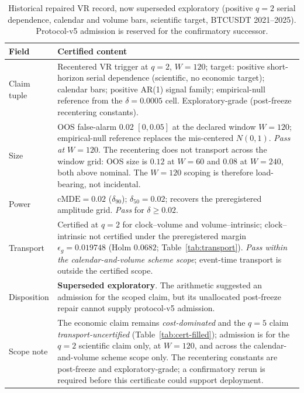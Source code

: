 \documentclass[3p]{elsarticle}
\newcommand{\epsg}{\ensuremath{\epsilon_g}}
\newcommand{\dataspan}{2021--2025}
\begin{document}
\begin{table}[htbp]
\centering
\begin{threeparttable}
\caption{Historical repaired VR record, now superseded exploratory
(positive $q{=}2$ serial dependence, calendar and volume bars, scientific
target, BTCUSDT \dataspan). Protocol-v5 admission is reserved for the
confirmatory successor.}
\label{tab:cert-admissible}
\small
\begin{tabularx}{\textwidth}{@{}lX@{}}
\toprule
Field & Certified content \\
\midrule
Claim tuple & Recentered VR trigger at $q{=}2$, $W{=}120$; target: positive short-horizon serial dependence (scientific, no economic target); calendar bars; positive AR(1) signal family; empirical-null reference from the $\delta\!=\!0.0005$ cell. Exploratory-grade (post-freeze recentering constants). \\
Size & OOS false-alarm $0.02$ $[0,0.05]$ at the declared window $W{=}120$; empirical-null reference replaces the mis-centered $N(0,1)$. \emph{Pass at $W{=}120$}. The recentering does not transport across the window grid: OOS size is $0.12$ at $W{=}60$ and $0.08$ at $W{=}240$, both above nominal. The $W{=}120$ scoping is therefore load-bearing, not incidental. \\
Power & $\mathrm{cMDE}=0.02$ ($\delta_{90}$); $\delta_{50}=0.02$; recovers the preregistered amplitude grid. \emph{Pass} for $\delta\ge0.02$. \\
Transport & Certified at $q{=}2$ for clock--volume and volume--intrinsic; clock--intrinsic not certified under the preregistered margin $\epsg=0.019748$ (Holm $0.0682$; Table~\ref{tab:transport}). \emph{Pass within the calendar-and-volume scheme scope}; event-time transport is outside the certified scope. \\
Disposition & \textbf{Superseded exploratory}. The arithmetic suggested an admission for the scoped claim, but its unallocated post-freeze repair cannot supply protocol-v5 admission. \\
Scope note & The economic claim remains \emph{cost-dominated} and the $q{=}5$ claim \emph{transport-uncertified} (Table~\ref{tab:cert-filled}); admission is for the $q{=}2$ scientific claim only, at $W{=}120$, and across the calendar-and-volume scheme scope only. The recentering constants are post-freeze and exploratory-grade; a confirmatory rerun is required before this certificate could support deployment. \\
\bottomrule
\end{tabularx}
\end{threeparttable}
\end{table}
\end{document}
